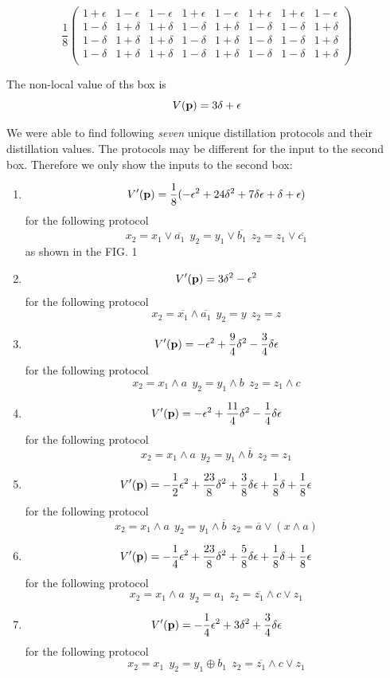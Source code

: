 \documentclass[aps,prl,twocolumn,groupedaddress]{revtex4}
\begin{document}
\begin{displaymath}
\frac{1}{8}
\left( \begin{array}{cccccccc}
1 + \epsilon & 1 - \epsilon & 1 - \epsilon & 1 + \epsilon & 1 - \epsilon & 1 + \epsilon & 1 + \epsilon & 1 - \epsilon  \\ 
1 - \delta & 1 + \delta & 1 + \delta & 1 - \delta & 1 + \delta & 1 - \delta & 1 - \delta & 1 + \delta \\ 
1 - \delta & 1 + \delta & 1 + \delta & 1 - \delta & 1 + \delta & 1 - \delta & 1 - \delta & 1 + \delta \\ 
1 - \delta & 1 + \delta & 1 + \delta & 1 - \delta & 1 + \delta & 1 - \delta & 1 - \delta & 1 + \delta \\ 
\end{array} \right)
\end{displaymath}

The non-local value of ths box is \[V({\bf p}) = 3 \delta + \epsilon\]

We were able to find following \emph{seven} unique distillation protocols and their distillation values. The protocols may be different for the input to the second box. Therefore we only show the inputs to the second box:

\begin{enumerate}
  \item \[V'({\bf p}) = \frac{1}{8}  (-\epsilon^2 + 24\delta^2 + 7\delta\epsilon + \delta + \epsilon) \] for the following protocol
  \[x_2 = x_1 \vee \overline{a_1}~~y_2 = y_1 \vee \overline{b_1}~~z_2 = z_1 \vee \overline{c_1} \] as shown in the FIG. 1 
  \item \[V'({\bf p}) = 3\delta^2 - \epsilon^2 \] for the following protocol
  \[x_2 = \overline{x_1} \wedge \overline{a_1}~~y_2 = y ~~z_2 = z \]
  \item  \[V'({\bf p}) = -\epsilon^2 + \frac{9}{4}\delta^2 - \frac{3}{4}\delta\epsilon \] for the following protocol
  \[x_2 = x_1 \wedge a~~y_2 = y_1 \wedge b~~z_2 = z_1 \wedge c\]
  \item  \[V'({\bf p}) = -\epsilon^2 + \frac{11}{4}\delta^2 - \frac{1}{4}\delta\epsilon \] for the following protocol
  \[ x_2 = x_1 \wedge a~~ y_2 = y_1 \wedge \overline{b}~~z_2 = z_1 \]
  \item  \[V'({\bf p}) =  - \frac{1}{2}\epsilon^2+ \frac{23}{8}\delta^2+ \frac{3}{8}\delta\epsilon+\frac{1}{8}\delta+\frac{1}{8}\epsilon \] for the following protocol
  \[x_2 = x_1 \wedge a~~ y_2 = y_1 \wedge \overline{b}~~z_2 = \overline{a} \vee (x \wedge a) \]
  \item  \[V'({\bf p}) =  -\frac{1}{4}\epsilon^2+\frac{23}{8}\delta^2+\frac{5}{8}\delta\epsilon+\frac{1}{8}\delta+\frac{1}{8}\epsilon \] for the following protocol
  \[x_2 = x_1 \wedge a~~ y_2 = a_1~~ z_2 = \overline{z_1} \wedge c \vee z_1 \]
  \item  \[V'({\bf p}) = -\frac{1}{4}\epsilon^2+3\delta^2+\frac{3}{4}\delta\epsilon\] for the following protocol
  \[ x_2 = x_1 ~~y_2 = y_1 \oplus b_1 ~~z_2 = \overline{z_1} \wedge c \vee z_1 \]
\end{enumerate}
\end{document}

